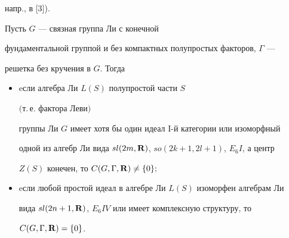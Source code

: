 напр., в [3]).





\begin{thm}


Пусть $G$ --- связная группа Ли с конечной


фундаментальной группой и без компактных полупростых факторов, $\Gamma$ ---


решетка без кручения в $G$. Тогда 


\begin{itemize}


\item[(i)] eсли алгебра Ли $L(S)$ полупростой части $S$


$($т.\,е. фактора Леви$)$


группы Ли $G$ имеет хотя бы один идеал $\mathrm I$-й категории или изоморфный


одной из алгебр Ли вида $sl(2m,\bold R)$, $so(2k+1,2l+1)$, $E_6I$, а центр


$Z(S)$ конечен, то $C(G,\Gamma, \bold R) \ne \{ 0 \};$


\item[(ii)] eсли любой простой идеал в алгебре Ли $L(S)$ изоморфен алгебрам Ли


вида $sl(2n+1,\bold R)$, $E_6IV$ или имеет комплексную структуру, то


$C(G, \Gamma, \bold R) = \{ 0 \}$.


\end{itemize}


\end{thm}





